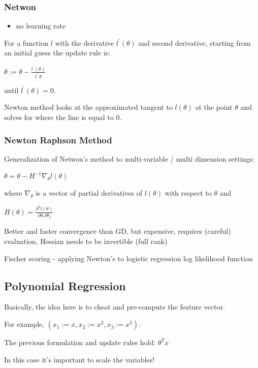 \subsubsection{Netwon}

\begin{itemize}
\item no learning rate
\end{itemize}

For a function $l$ with the derivative $l^\prime(\theta)$ and second derivative, starting from an initial guess the update rule is:

$\theta := \theta - \frac{l^\prime(\theta)}{l^{\prime\prime}\theta}$

until $l^\prime(\theta)=0$. 

Newton method looks at the approximated tangent to $l(\theta)$ at the point $\theta$ and solves for where the line is equal to 0.

\subsubsection{Newton Raphson Method}

Generalization of Netwon's method to multi-variable / multi dimension settings:

$\theta = \theta - H^{-1}\nabla_\theta l(\theta)$

where $\nabla_\theta$ is a vector of partial derivatives of $l(\theta)$ with respect to $\theta$ and 

$H(\theta)=\frac{\partial^2 l(\theta)}{\partial \theta_i\partial\theta_j}$

Better and faster convergence than GD, but expensive, requires (careful) evaluation, Hessian needs to be invertible (full rank)

Fischer scoring - applying Newton's to logistic regression log likelihood function

\subsection{Polynomial Regression}

Basically, the idea here is to cheat and pre-compute the feature vector. 

For example, $(x_1 := x, x_2 := x^2, x_3 := x^3)$. 

The previous formulation and update rules hold: $\theta^Tx$

In this case it's important to scale the variables!

